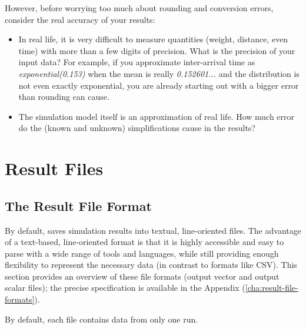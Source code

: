 However, before worrying too much about rounding and conversion errors, consider
the real accuracy of your results:

\begin{itemize}
  \item In real life, it is very difficult to measure quantities (weight,
    distance, even time) with more than a few digits of precision. What is the
    precision of your input data? For example, if you approximate inter-arrival
    time as \textit{exponential(0.153)} when the mean is really
    \textit{0.152601...} and the distribution is not even exactly exponential, you
    are already starting out with a bigger error than rounding can cause.
  \item The simulation model itself is an approximation of real life. How much
    error do the (known and unknown) simplifications cause in the results?
\end{itemize}



\section{Result Files}
\label{sec:ana-sim:result-files}

\subsection{The {\opp} Result File Format}
\label{sec:ana-sim:omnetpp-result-file-format}

By default, {\opp} saves simulation results into textual, line-oriented files.
The advantage of a text-based, line-oriented format is that it is highly
accessible and easy to parse with a wide range of tools and languages, while
still providing enough flexibility to represent the necessary data (in contrast
to formats like CSV). This section provides an overview of these file formats
(output vector and output scalar files); the precise specification is available
in the Appendix (\ref{cha:result-file-formats}).


By default, each file contains data from only one run.

